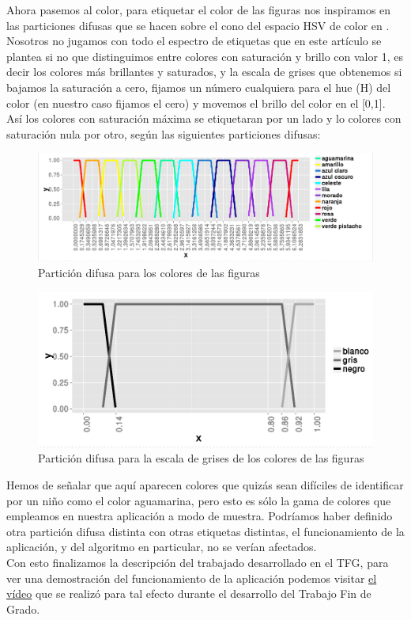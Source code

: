 \documentclass[10pt,a4paper]{article}
\begin{document}
Ahora pasemos al color, para etiquetar el color de las figuras nos inspiramos en las particiones difusas que se hacen sobre el cono del espacio HSV de color en \cite{artDaniHSV}. Nosotros no jugamos con todo el espectro de etiquetas que en este artículo se plantea si no que distinguimos entre colores con saturación y brillo con valor 1, es decir los colores más brillantes y saturados, y la escala de grises que obtenemos si bajamos la saturación a cero, fijamos un número cualquiera para el hue (H) del color (en nuestro caso fijamos el cero) y movemos el brillo del color en el [0,1]. Así los colores con saturación máxima se etiquetaran por un lado y lo colores con saturación nula por otro, según las siguientes particiones difusas:\\

\begin{figure}[H]
\centering
\includegraphics[width = \textwidth]{img/partitionColor.png}
\caption{Partición difusa para los colores de las figuras}
\end{figure}

\begin{figure}[H]
\centering
\includegraphics[width = \textwidth]{img/partitionGrey.png}
\caption{Partición difusa para la escala de grises de los colores de las figuras}
\end{figure}

Hemos de señalar que aquí aparecen colores que quizás sean difíciles de identificar por un niño como el color aguamarina, pero esto es sólo la gama de colores que empleamos en nuestra aplicación a modo de muestra. Podríamos haber definido otra partición difusa distinta con otras etiquetas distintas, el funcionamiento de la aplicación, y del algoritmo en particular, no se verían afectados.\\

Con esto finalizamos la descripción del trabajado desarrollado en el TFG, para ver una demostración del funcionamiento de la aplicación podemos visitar \href{https://www.youtube.com/watch?v=sfQNCcHsYu8}{el vídeo} que se realizó para tal efecto durante el desarrollo del Trabajo Fin de Grado.
\newpage

\nocite{*}


\end{document}
